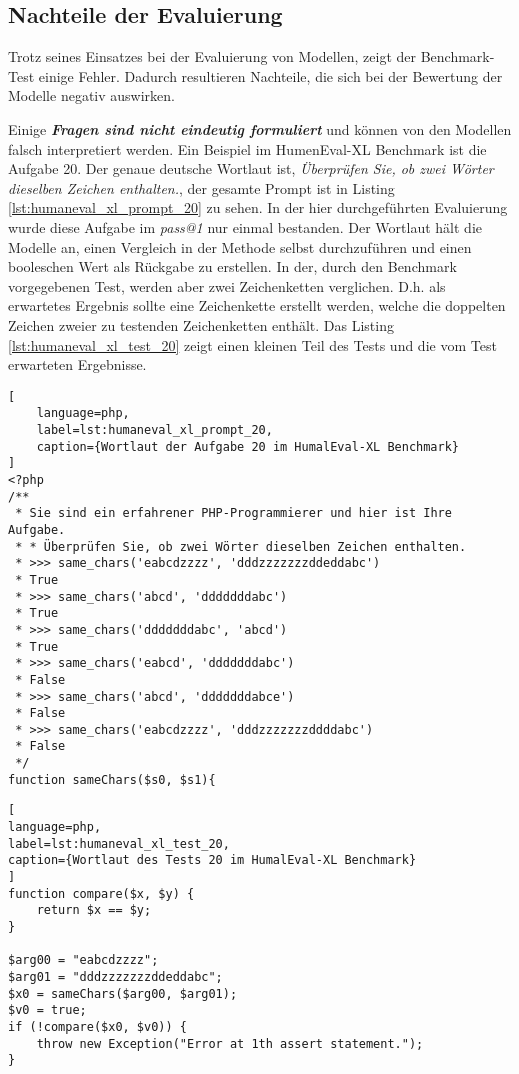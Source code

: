 \subsection{Nachteile der Evaluierung}\label{subsec:disadvantages_of_evaluation}
Trotz seines Einsatzes bei der Evaluierung von Modellen, zeigt der Benchmark-Test einige Fehler. Dadurch resultieren Nachteile, die sich bei der Bewertung der Modelle negativ auswirken.\vspace{0.2cm}

Einige \textit{\textbf{Fragen sind nicht eindeutig formuliert}} und können von den Modellen falsch interpretiert werden. Ein Beispiel im HumenEval-XL Benchmark ist die Aufgabe 20. Der genaue deutsche Wortlaut ist, \textit{Überprüfen Sie, ob zwei Wörter dieselben Zeichen enthalten.}, der gesamte Prompt ist in Listing \ref{lst:humaneval_xl_prompt_20} zu sehen. In der hier durchgeführten Evaluierung wurde diese Aufgabe im \textit{pass@1} nur einmal bestanden. Der Wortlaut hält die Modelle an, einen Vergleich in der Methode selbst durchzuführen und einen booleschen Wert als Rückgabe zu erstellen. In der, durch den Benchmark vorgegebenen Test, werden aber zwei Zeichenketten verglichen. D.h. als erwartetes Ergebnis sollte eine Zeichenkette erstellt werden, welche die doppelten Zeichen zweier zu testenden Zeichenketten enthält. Das Listing \ref{lst:humaneval_xl_test_20} zeigt einen kleinen Teil des Tests und die vom Test erwarteten Ergebnisse.\vspace{0.2cm}

\begin{lstlisting}[
	language=php,
	label=lst:humaneval_xl_prompt_20,
	caption={Wortlaut der Aufgabe 20 im HumalEval-XL Benchmark}
]
<?php
/**
 * Sie sind ein erfahrener PHP-Programmierer und hier ist Ihre Aufgabe.
 * * Überprüfen Sie, ob zwei Wörter dieselben Zeichen enthalten.
 * >>> same_chars('eabcdzzzz', 'dddzzzzzzzddeddabc')
 * True
 * >>> same_chars('abcd', 'dddddddabc')
 * True
 * >>> same_chars('dddddddabc', 'abcd')
 * True
 * >>> same_chars('eabcd', 'dddddddabc')
 * False
 * >>> same_chars('abcd', 'dddddddabce')
 * False
 * >>> same_chars('eabcdzzzz', 'dddzzzzzzzddddabc')
 * False
 */
function sameChars($s0, $s1){
\end{lstlisting}

\begin{lstlisting}[
language=php,
label=lst:humaneval_xl_test_20,
caption={Wortlaut des Tests 20 im HumalEval-XL Benchmark}
]
function compare($x, $y) {
    return $x == $y;
}

$arg00 = "eabcdzzzz";
$arg01 = "dddzzzzzzzddeddabc";
$x0 = sameChars($arg00, $arg01);
$v0 = true;
if (!compare($x0, $v0)) {
    throw new Exception("Error at 1th assert statement.");
}
\end{lstlisting}

